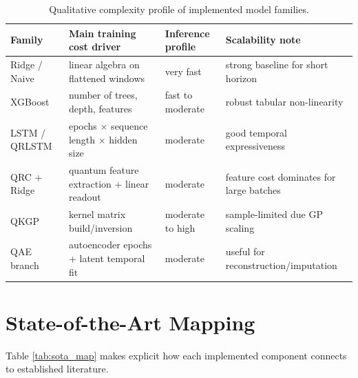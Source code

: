 \documentclass[11pt]{article}
\begin{document}
\begin{table}[H]
\centering
\caption{Qualitative complexity profile of implemented model families.}
\begin{tabular}{p{2.4cm}p{4.2cm}p{3.0cm}p{4.2cm}}
\toprule
Family & Main training cost driver & Inference profile & Scalability note \\
\midrule
Ridge / Naive & linear algebra on flattened windows & very fast & strong baseline for short horizon \\
XGBoost & number of trees, depth, features & fast to moderate & robust tabular non-linearity \\
LSTM / QRLSTM & epochs \(\times\) sequence length \(\times\) hidden size & moderate & good temporal expressiveness \\
QRC + Ridge & quantum feature extraction + linear readout & moderate & feature cost dominates for large batches \\
QKGP & kernel matrix build/inversion & moderate to high & sample-limited due GP scaling \\
QAE branch & autoencoder epochs + latent temporal fit & moderate & useful for reconstruction/imputation \\
\bottomrule
\end{tabular}
\end{table}

\section{State-of-the-Art Mapping}
Table \ref{tab:sota_map} makes explicit how each implemented component connects to established literature.
\end{document}
